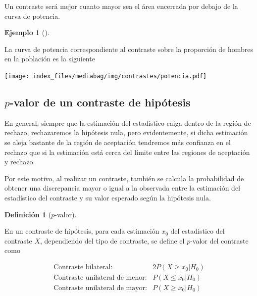 \documentclass[
  a4paper,
]{scrreport}
\theoremstyle{plain}
\theoremstyle{definition}
\newtheorem{definition}{Definición}[chapter]
\theoremstyle{definition}
\newtheorem{example}{Ejemplo}[chapter]
\theoremstyle{remark}
\begin{document}
Un contraste será mejor cuanto mayor sea el área encerrada por debajo de
la curva de potencia.

\begin{example}[]\protect\hypertarget{exm-curva-potencia}{}\label{exm-curva-potencia}

La curva de potencia correspondiente al contraste sobre la proporción de
hombres en la población es la siguiente

\begin{center}
\texttt{[image: index\_files/mediabag/img/contrastes/potencia.pdf]}
\end{center}

\end{example}

\subsection{\texorpdfstring{\(p\)-valor de un contraste de
hipótesis}{p-valor de un contraste de hipótesis}}\label{p-valor-de-un-contraste-de-hipuxf3tesis}

En general, siempre que la estimación del estadístico caiga dentro de la
región de rechazo, rechazaremos la hipótesis nula, pero evidentemente,
si dicha estimación se aleja bastante de la región de aceptación
tendremos más confianza en el rechazo que si la estimación está cerca
del límite entre las regiones de aceptación y rechazo.

Por este motivo, al realizar un contraste, también se calcula la
probabilidad de obtener una discrepancia mayor o igual a la observada
entre la estimación del estadístico del contraste y su valor esperado
según la hipótesis nula.

\begin{definition}[\(p\)-valor]\protect\hypertarget{def-p-valor}{}\label{def-p-valor}

En un contraste de hipótesis, para cada estimación \(x_0\) del
estadístico del contraste \(X\), dependiendo del tipo de contraste, se
define el \(p\)-valor del contraste como

\[
\begin{array}{lc}
\mbox{Contraste bilateral}: & 2P(X\geq x_0|H_0) \\
\mbox{Contraste unilateral de menor}: & P(X\leq x_0|H_0) \\
\mbox{Contraste unilateral de mayor}: & P(X\geq x_0|H_0)
\end{array}
\]

\end{definition}
\end{document}
